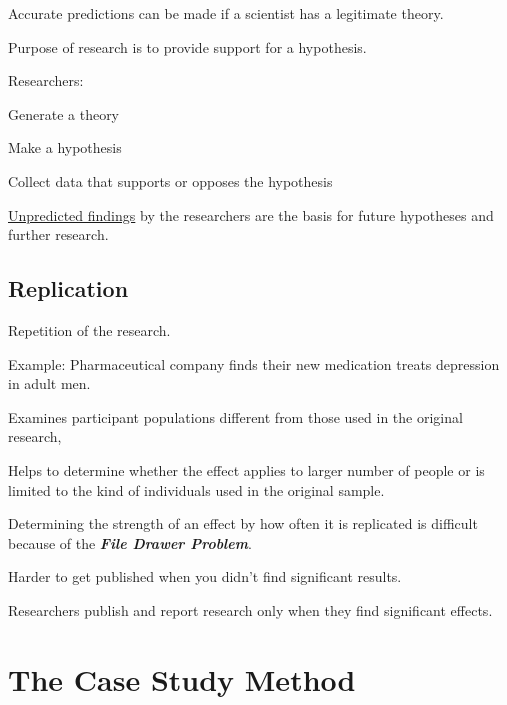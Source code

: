 \begin{coloredlist}
    \item Accurate predictions can be made if a scientist has a legitimate theory.
    \item Purpose of research is to provide support for a hypothesis.
    \item Researchers:
    \begin{coloredlist}
        \item Generate a theory
        \item Make a hypothesis
        \item Collect data that supports or opposes the hypothesis
    \end{coloredlist}
    \underline{Unpredicted findings} by the researchers are the basis for future hypotheses and further research. 
\end{coloredlist}

\subsection{Replication}

\begin{coloredlist}
    \item Repetition of the research.
    \begin{coloredlist}
        \item Example: Pharmaceutical company finds their new medication treats depression in adult men.
    \end{coloredlist}
    \item Examines participant populations different from those used in the original research,
    \item Helps to determine whether the effect applies to larger number of people or is limited to the kind of individuals used in the original sample.
    \item Determining the strength of an effect by how often it is replicated is difficult because of the \textbf{\textit{File Drawer Problem}}.
    \begin{coloredlist}
        \item Harder to get published when you didn't find significant results.
        \item Researchers publish and report research only when they find significant effects.
    \end{coloredlist}
\end{coloredlist}

\section{The Case Study Method}

